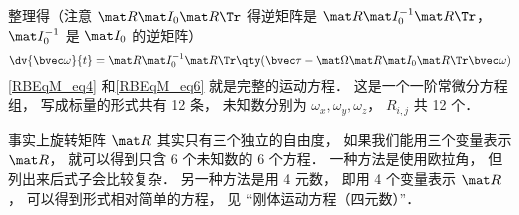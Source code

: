 整理得（注意 $\mat R \mat I_0 \mat R\Tr$ 得逆矩阵是 $\mat R \mat I_0^{-1} \mat R\Tr$， $\mat I_0^{-1}$ 是 $\mat I_0$ 的逆矩阵）%
\begin{equation}\label{RBEqM_eq6}
\dv{\bvec \omega}{t} = \mat R \mat I_0^{-1} \mat R\Tr \qty(\bvec \tau  - \mat \Omega \mat R \mat I_0 \mat R\Tr \bvec\omega)
\end{equation}
\autoref{RBEqM_eq4} 和\autoref{RBEqM_eq6} 就是完整的运动方程． 这是一个一阶常微分方程组， 写成标量的形式共有 12 条， 未知数分别为 $\omega_x, \omega_y, \omega_z$， $R_{i,j}$ 共 12 个．

事实上旋转矩阵 $\mat R$ 其实只有三个独立的自由度， 如果我们能用三个变量表示 $\mat R$， 就可以得到只含 6 个未知数的 6 个方程． 一种方法是使用欧拉角， 但列出来后式子会比较复杂． 另一种方法是用 4 元数， 即用 4 个变量表示 $\mat R$， 可以得到形式相对简单的方程， 见 “刚体运动方程（四元数）”．
